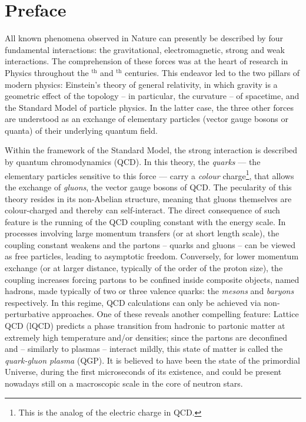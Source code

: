 \chapter{Preface}
\label{chap:Chapter1}

All known phenomena observed in Nature can presently be described by four fundamental interactions: the gravitational, electromagnetic, strong and weak interactions. The comprehension of these forces was at the heart of research in Physics throughout the $^{\textrm{th}}$ and $^{\textrm{th}}$ centuries. This endeavor led to the two pillars of modern physics: Einstein's theory of general relativity, in which gravity is a geometric effect of the topology -- in particular, the curvature -- of spacetime, and the Standard Model of particle physics. In the latter case, the three other forces are understood as an exchange of elementary particles (vector gauge bosons or quanta) of their underlying quantum field.

Within the framework of the Standard Model, the strong interaction is described by quantum chromodynamics (QCD). In this theory, the \textit{quarks} --- the elementary particles sensitive to this force --- carry a \textit{colour} charge\footnote{This is the analog of the electric charge in QCD.}, that allows the exchange of \textit{gluons}, the vector gauge bosons of QCD. The pecularity of this theory resides in its non-Abelian structure, meaning that gluons themselves are colour-charged and thereby can self-interact. The direct consequence of such feature is the running of the QCD coupling constant with the energy scale. In processes involving large momentum transfers (or at short length scale), the coupling constant weakens and the partons -- quarks and gluons -- can be viewed as free particles, leading to asymptotic freedom. Conversely, for lower momentum exchange (or at larger distance, typically of the order of the proton size), the coupling increases forcing partons to be confined inside composite objects, named hadrons, made typically of two or three valence quarks: the \textit{mesons} and \textit{baryons} respectively. In this regime, QCD calculations can only be achieved via non-perturbative approaches. One of these reveals another compelling feature: Lattice QCD (lQCD) predicts a phase transition from hadronic to partonic matter at extremely high temperature and/or densities; since the partons are deconfined and -- similarly to plasmas -- interact mildly, this state of matter is called the \textit{quark-gluon plasma} (QGP). It is believed to have been the state of the primordial Universe, during the first microseconds of its existence, and could be present nowadays still on a macroscopic scale in the core of neutron stars. \\

